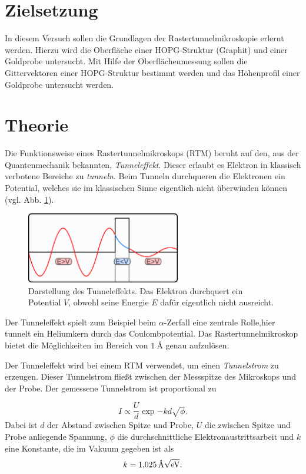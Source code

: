 \setcounter{page}{1}
\section*{Zielsetzung}
In diesem Versuch sollen die Grundlagen der Rastertunnelmikroskopie
erlernt werden.
Hierzu wird die Oberfläche einer HOPG-Struktur (Graphit) und einer
Goldprobe untersucht. Mit Hilfe der Oberflächenmessung sollen die Gittervektoren
einer HOPG-Struktur bestimmt werden und das Höhenprofil einer Goldprobe untersucht werden.

\section{Theorie}
Die Funktionsweise eines Rastertunnelmikroskops (RTM) beruht auf den, aus der Quantenmechanik bekannten,
\emph{Tunneleffekt}. Dieser erlaubt es Elektron in klassisch verbotene Bereiche zu \emph{tunneln}.
Beim Tunneln durchqueren die Elektronen ein Potential, welches sie im klassischen Sinne
eigentlich nicht überwinden können (vgl. Abb. \ref{fig: tunneleffekt}).
\begin{figure}[!h]
  \centering
  \includegraphics[width=0.6\textwidth]{./pics/tunelleffekt.png}
  \caption{Darstellung des Tunneleffekts.
  Das Elektron durchquert ein Potential $V$, obwohl seine Energie $E$ dafür eigentlich nicht ausreicht. \cite{tunnel}}
  \label{fig: tunneleffekt}
\end{figure}
Der Tunneleffekt spielt zum Beispiel beim $\alpha$-Zerfall eine zentrale Rolle,hier tunnelt ein Heliumkern durch das Coulombpotential.
Das Rastertunnelmikroskop bietet die Möglichkeiten im Bereich von $\SI{1}{\angstrom}$ genau aufzulösen.

Der Tunneleffekt wird bei einem RTM verwendet, um einen \emph{Tunnelstrom} zu erzeugen. Dieser Tunnelstrom
fließt zwischen der Messspitze des Mikroskops und der Probe.
Der gemessene Tunnelstrom ist proportional zu

\begin{equation}
  \label{eq: tunnelstrom}
I\propto \frac{U}{d}\exp{-kd\sqrt{\phi}}.
\end{equation}
Dabei ist $d$ der Abstand zwischen Spitze und Probe, $U$ die zwischen Spitze und Probe anliegende Spannung,
$\phi$ die durchschnittliche Elektronaustrittsarbeit und $k$ eine Konstante, die im Vakuum gegeben ist als
\begin{equation*}
  k=\SI{1.025}{\per\angstrom\sqrt{\eV}}.
\end{equation*}

